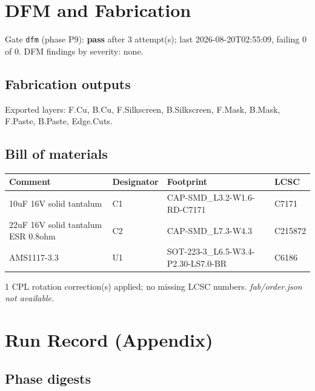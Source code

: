 \documentclass[11pt,a4paper]{article}
\begin{document}
\section{DFM and Fabrication}
Gate \texttt{dfm} (phase P9): \textbf{pass} after 3 attempt(s); last 2026-08-20T02:55:09, failing 0 of 0.
DFM findings by severity: none.
\subsection*{Fabrication outputs}
Exported layers: F.Cu, B.Cu, F.Silkscreen, B.Silkscreen, F.Mask, B.Mask, F.Paste, B.Paste, Edge.Cuts.
\subsection*{Bill of materials}
{\small
\begin{longtable}{p{4.4cm}p{2.8cm}p{4.6cm}l}
\toprule
\textbf{Comment} & \textbf{Designator} & \textbf{Footprint} & \textbf{LCSC} \\
\midrule
\endhead
10uF 16V solid tantalum & C1 & CAP-SMD\_L3.2-W1.6-RD-C7171 & C7171 \\
22uF 16V solid tantalum ESR 0.8ohm & C2 & CAP-SMD\_L7.3-W4.3 & C215872 \\
AMS1117-3.3 & U1 & SOT-223-3\_L6.5-W3.4-P2.30-LS7.0-BR & C6186 \\
\bottomrule
\end{longtable}
}
1 CPL rotation correction(s) applied; no missing LCSC numbers.
\emph{fab/order.json not available.}
\section{Run Record (Appendix)}
\subsection*{Phase digests}
\end{document}
